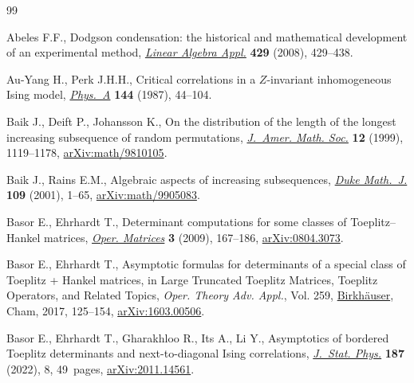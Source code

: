 \documentclass[10pt,a4paper]{amsart}
\numberwithin{equation}{section}
\begin{document}
%
%

\begin{thebibliography}{99}
\footnotesize\itemsep=0pt

Abeles F.F., Dodgson condensation: the historical and mathematical development
 of an experimental method, \href{https://doi.org/10.1016/j.laa.2007.11.022}{\textit{Linear Algebra Appl.}} \textbf{429} (2008),
 429--438.

Au-Yang H., Perk J.H.H., Critical correlations in a {$Z$}-invariant
 inhomogeneous {I}sing model, \href{https://doi.org/10.1016/0378-4371(87)90145-2}{\textit{Phys.~A}} \textbf{144} (1987), 44--104.

Baik J., Deift P., Johansson K., On the distribution of the length of the
 longest increasing subsequence of random permutations, \href{https://doi.org/10.1090/S0894-0347-99-00307-0}{\textit{J.~Amer. Math.
 Soc.}} \textbf{12} (1999), 1119--1178, \href{https://arxiv.org/abs/math/9810105}{arXiv:math/9810105}.

Baik J., Rains E.M., Algebraic aspects of increasing subsequences, \href{https://doi.org/10.1215/S0012-7094-01-10911-3}{\textit{Duke
 Math.~J.}} \textbf{109} (2001), 1--65, \href{https://arxiv.org/abs/math/9905083}{arXiv:math/9905083}.

Basor E., Ehrhardt T., Determinant computations for some classes of
 {T}oeplitz--{H}ankel matrices, \href{https://doi.org/10.7153/oam-03-09}{\textit{Oper. Matrices}} \textbf{3} (2009),
 167--186, \href{https://arxiv.org/abs/0804.3073}{arXiv:0804.3073}.

Basor E., Ehrhardt T., Asymptotic formulas for determinants of a special class
 of {T}oeplitz + {H}ankel matrices, in Large {T}runcated {T}oeplitz
 {M}atrices, {T}oeplitz {O}perators, and {R}elated {T}opics, \textit{Oper.
 Theory Adv. Appl.}, Vol. 259, \href{https://doi.org/10.1007/978-3-319-49182-0_9}{Birkh\"auser}, Cham, 2017, 125--154,
 \href{https://arxiv.org/abs/1603.00506}{arXiv:1603.00506}.

Basor E., Ehrhardt T., Gharakhloo R., Its A., Li Y., Asymptotics of bordered
 {T}oeplitz determinants and next-to-diagonal {I}sing correlations,
 \href{https://doi.org/10.1007/s10955-022-02894-7}{\textit{J.~Stat. Phys.}} \textbf{187} (2022), 8, 49~pages,
 \href{https://arxiv.org/abs/2011.14561}{arXiv:2011.14561}.




\end{thebibliography}
\end{document}
